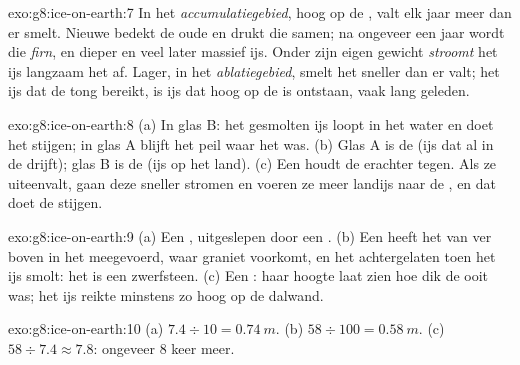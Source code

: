 \begin{solution}{exo:g8:ice-on-earth:7}
In het \emph{accumulatiegebied}, hoog op de , valt elk jaar meer
 dan er smelt. Nieuwe  bedekt de oude  en drukt die
samen; na ongeveer een jaar wordt die \emph{firn}, en dieper en veel later
massief ijs. Onder zijn eigen gewicht \emph{stroomt} het ijs langzaam het
 af. Lager, in het \emph{ablatiegebied}, smelt het sneller dan er
 valt; het ijs dat de tong bereikt, is ijs dat hoog op de  is
ontstaan, vaak lang geleden.
\end{solution}

\begin{solution}{exo:g8:ice-on-earth:8}
(a) In glas B: het gesmolten ijs loopt in het water en doet het stijgen; in
glas A blijft het peil waar het was. (b) Glas A is de  (ijs dat al
in de  drijft); glas B is de  (ijs op het land). (c) Een 
houdt de  erachter tegen. Als ze uiteenvalt, gaan deze 
sneller stromen en voeren ze meer landijs naar de , en dat doet de 
stijgen.
\end{solution}

\begin{solution}{exo:g8:ice-on-earth:9}
(a) Een , uitgeslepen door een . (b) Een  heeft het
van ver boven in het  meegevoerd, waar graniet voorkomt, en het
achtergelaten toen het ijs smolt: het is een zwerfsteen. (c) Een
: haar hoogte laat zien hoe dik de  ooit was; het ijs
reikte minstens zo hoog op de dalwand.
\end{solution}

\begin{solution}{exo:g8:ice-on-earth:10}
(a) $7.4 \div 10 = \qty{0.74}{m}$. (b) $58 \div 100 = \qty{0.58}{m}$.
(c) $58 \div 7.4 \approx 7.8$: ongeveer 8 keer meer.
\end{solution}

